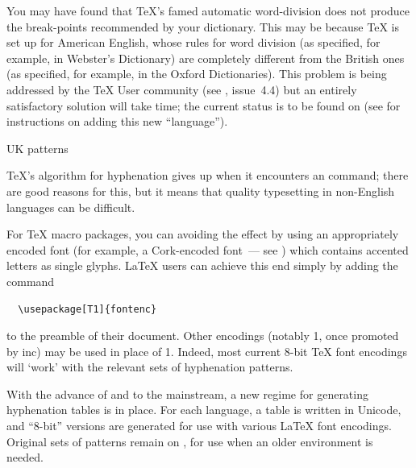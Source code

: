 
You may have found that \TeX{}'s famed automatic word-division does
not produce the break-points recommended by your dictionary. This may be
because \TeX{} is set up for American English, whose rules for word
division (as specified, for example, in Webster's Dictionary) are
completely different from the British ones (as specified, for example,
in the Oxford Dictionaries). This problem is being addressed by the 
\TeX{} User community (see \BV{}, issue~4.4) but an entirely
satisfactory solution will take time; the current status is to be
found on  (see
 for instructions
on adding this new ``language'').
\begin{ctanrefs}
\item[UK patterns]
\end{ctanrefs}


\TeX{}'s algorithm for hyphenation gives up when it encounters an
 command; there are good reasons for this, but it means
that quality typesetting in non-English languages can be difficult.

For \TeX{} macro packages, you can avoiding the effect by using an
appropriately encoded font (for example, a Cork-encoded font~--- see
) which contains accented
letters as single glyphs.  \LaTeX{} users can achieve this end simply
by adding the command
\begin{verbatim}
  \usepackage[T1]{fontenc}
\end{verbatim}
to the preamble of their document.  Other encodings (notably
1, once promoted by \YandY{} inc) may be used
in place of 1.  Indeed, most current 8-bit \TeX{} font
encodings will `work' with the relevant sets of hyphenation patterns. 

With the advance of \xetex{} and \LuaTeX{} to the mainstream, a new
regime for generating hyphenation tables is in place.  For each
language, a table is written in Unicode, and ``8-bit'' versions are
generated for use with various \LaTeX{} font encodings.  Original sets
of patterns remain on , for use when an older environment
is needed.


